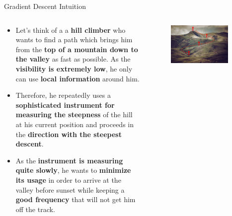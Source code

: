 \documentclass[main.tex]{subfiles}
\begin{document}
    \begin{frame}{Gradient Descent Intuition}
        \begin{columns}
            \begin{column}{0.6\textwidth}
                \begin{itemize}
                    \item Let's think of a a \textbf{hill climber} who wants to find a path which brings him from the \textbf{top of a mountain down to the valley} as fast as possible. As the \textbf{visibility is extremely low}, he only can use \textbf{local information} around him. 
                    \item Therefore, he repeatedly uses a \textbf{sophisticated instrument for measuring the steepness} of the hill at his current position and proceeds in the \textbf{direction with the steepest descent}.
                    \item As the \textbf{instrument is measuring quite slowly}, he wants to \textbf{minimize its usage} in order to arrive at the valley before sunset while keeping a \textbf{good frequency} that will not get him off the track.
                \end{itemize}
            \end{column}
            \begin{column}{0.4\textwidth}
                \begin{figure}
                    \label{fig:hill-climber-analogy}
                    \includegraphics[width=0.9\textwidth, keepaspectratio]{figures/external/hill-climber-analogy.jpg}
                \end{figure}
            \end{column}
        \end{columns}
    \end{frame}
\end{document}
